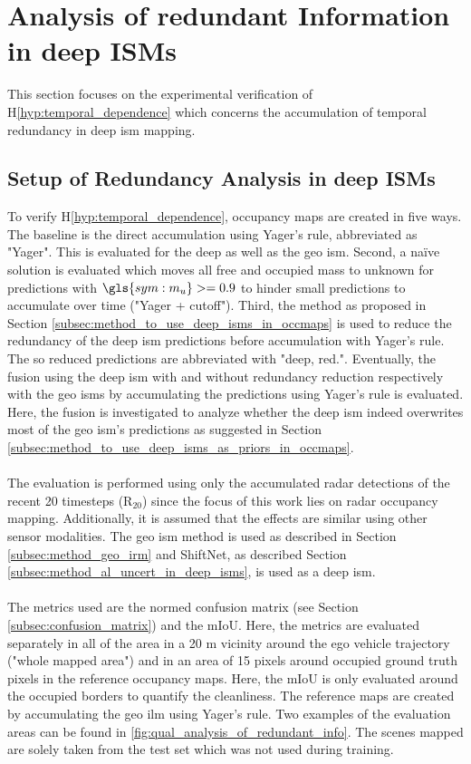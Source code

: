 \section{Analysis of redundant Information in deep ISMs}
\label{sec:exp_analyze_redundant_info}
This section focuses on the experimental verification of H\ref{hyp:temporal_dependence} which concerns the accumulation of temporal redundancy in deep \gls{ism} mapping.
%
\subsection{Setup of Redundancy Analysis in deep ISMs}
\label{subsec:setup_of_red_analy}
To verify H\ref{hyp:temporal_dependence}, occupancy maps are created in five ways. The baseline is the direct accumulation using Yager's rule, abbreviated as "Yager". This is evaluated for the deep as well as the geo \gls{ism}. Second, a na\"ive solution is evaluated which moves all free and occupied mass to unknown for predictions with $\gls{sym:m_u}>=0.9$ to hinder small predictions to accumulate over time ("Yager + cutoff"). Third, the method as proposed in Section \ref{subsec:method_to_use_deep_isms_in_occmaps} is used to reduce the redundancy of the deep \gls{ism} predictions before accumulation with Yager's rule. The so reduced predictions are abbreviated with "deep, red.". Eventually, the fusion using the deep \gls{ism} with and without redundancy reduction respectively with the geo \gls{ism}s by accumulating the predictions using Yager's rule is evaluated. Here, the fusion is investigated to analyze whether the deep \gls{ism} indeed overwrites most of the geo \gls{ism}'s predictions as suggested in Section \ref{subsec:method_to_use_deep_isms_as_priors_in_occmaps}.
\\\\
The evaluation is performed using only the accumulated radar detections of the recent 20 timesteps (R$_{20}$) since the focus of this work lies on radar occupancy mapping. Additionally, it is assumed that the effects are similar using other sensor modalities. The geo \gls{ism} method is used as described in Section \ref{subsec:method_geo_irm} and ShiftNet, as described Section \ref{subsec:method_al_uncert_in_deep_isms}, is used as a deep \gls{ism}.
\\\\
The metrics used are the normed confusion matrix (see Section \ref{subsec:confusion_matrix}) and the mIoU. Here, the metrics are evaluated separately in all of the area in a 20 m vicinity around the ego vehicle trajectory ("whole mapped area") and in an area of 15 pixels around occupied ground truth pixels in the reference occupancy maps. Here, the mIoU is only evaluated around the occupied borders to quantify the cleanliness. The reference maps are created by accumulating the geo \gls{ilm} using Yager's rule. Two examples of the evaluation areas can be found in \ref{fig:qual_analysis_of_redundant_info}. The scenes mapped are solely taken from the test set which was not used during training.
%
